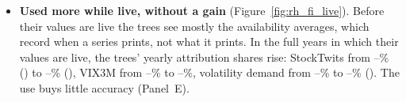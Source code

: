 \begin{itemize}
  \rhabLiveVdStart{} to \rhabLiveVdEnd, when its feed ends: \rhabLiveVdDays{} trading days,
  \rhlvVdEvLo--\rhlvVdEvHi\% of the scored bars. The sample shows that it does not help there, not that it cannot
  help.
\item \textbf{Used more while live, without a gain} (Figure~\ref{fig:rh_fi_live}). Before their values are live the
  trees see mostly the availability averages, which record when a series prints, not what it prints. In the full
  years in which their values are live, the trees' yearly attribution shares rise: StockTwits from
  \rhfilStwPreMin--\rhfilStwPreMax\% (\rhfilStwPreYears) to \rhfilStwLiveMin--\rhfilStwLiveMax\%
  (\rhfilStwLiveYears), VIX3M from \rhfilVixThreePreMin--\rhfilVixThreePreMax\% to
  \rhfilVixThreeLiveMin--\rhfilVixThreeLiveMax\%, volatility demand from \rhfilVdPreMin--\rhfilVdPreMax\% to
  \rhfilVdLiveMin--\rhfilVdLiveMax\% (\rhfilVdLiveYears). The use buys little accuracy (Panel~E).
\end{itemize}

